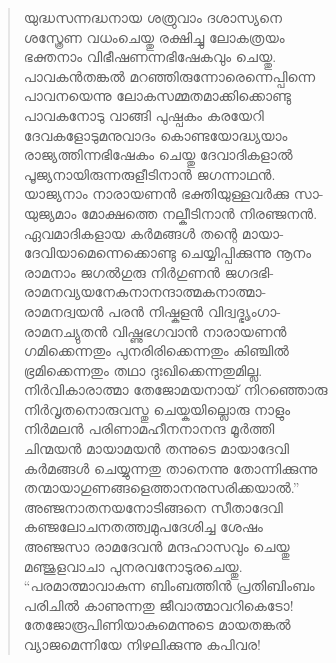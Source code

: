 \begin{verse}
യുദ്ധസന്നദ്ധനായ ശത്രുവാം ദശാസ്യനെ\\
ശസ്ത്രേണ വധംചെയ്തു രക്ഷിച്ചു ലോകത്രയം\\
ഭക്തനാം വിഭീഷണന്നഭിഷേകവും ചെയ്തു.\\
പാവകന്‍തങ്കല്‍ മറഞ്ഞിരുന്നോരെന്നെപ്പിന്നെ\\
പാവനയെന്നു ലോകസമ്മതമാക്കിക്കൊണ്ടു\\
പാവകനോടു വാങ്ങി പുഷ്പകം കരയേറി\\
ദേവകളോടുമനുവാദം കൊണ്ടയോദ്ധ്യയാം\\
രാജ്യത്തിന്നഭിഷേകം ചെയ്തു ദേവാദികളാല്‍\\
പൂജ്യനായിരുന്നരുളീടിനാന്‍ ജഗന്നാഥന്‍.\\
യാജ്യനാം നാരായണന്‍ ഭക്തിയുള്ളവര്‍ക്കു സാ-\\
യുജ്യമാം മോക്ഷത്തെ നല്കീടിനാന്‍ നിരഞ്ജനന്‍.\\
ഏവമാദികളായ കര്‍മങ്ങള്‍ തന്റെ മായാ-\\
ദേവിയാമെന്നെക്കൊണ്ടു ചെയ്യിപ്പിക്കുന്നു നൂനം\\
രാമനാം ജഗല്‍ഗുരു നിര്‍ഗുണന്‍ ജഗദഭി-\\
രാമനവ്യയനേകനാനന്ദാത്മകനാത്മാ-\\
രാമനദ്വയന്‍ പരന്‍ നിഷ്കളന്‍ വിദ്വദ്ഭൃംഗാ-\\
രാമനച്യുതന്‍ വിഷ്ണുഭഗവാന്‍ നാരായണന്‍\\
ഗമിക്കെന്നതും പുനരിരിക്കെന്നതും കിഞ്ചില്‍\\
ഭ്രമിക്കെന്നതും തഥാ ദുഃഖിക്കെന്നതുമില്ല.\\
നിര്‍വികാരാത്മാ തേജോമയനായ് നിറഞ്ഞൊരു\\
നിര്‍വൃതനൊരുവസ്തു ചെയ്കയില്ലൊരു നാളും\\
നിര്‍മലന്‍ പരിണാമഹീനനാനന്ദ മൂര്‍ത്തി\\
ചിന്മയന്‍ മായാമയന്‍ തന്നുടെ മായാദേവി\\
കര്‍മങ്ങള്‍ ചെയ്യുന്നതു താനെന്നു തോന്നിക്കുന്നു\\
തന്മായാഗുണങ്ങളെത്താനനുസരിക്കയാല്‍.”\\
അഞ്ജനാതനയനോടിങ്ങനെ സീതാദേവി\\
കഞ്ജലോചനതത്ത്വമുപദേശിച്ച ശേഷം\\
അഞ്ജസാ രാമദേവന്‍ മന്ദഹാസവും ചെയ്തു\\
മഞ്ജുളവാചാ പുനരവനോടുരചെയ്തു.\\
“പരമാത്മാവാകുന്ന ബിംബത്തിന്‍ പ്രതിബിംബം\\
പരിചില്‍ കാണുന്നതു ജീവാത്മാവറികെടോ!\\
തേജോരൂപിണിയാകുമെന്നുടെ മായതങ്കല്‍\\
വ്യാജമെന്നിയേ നിഴലിക്കുന്നു കപിവര!\\

\end{verse}
